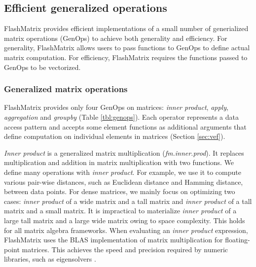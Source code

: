 
\subsection{Efficient generalized operations}
FlashMatrix provides efficient implementations of a small number of
generialized matrix operations (GenOps) to achieve both generality and
efficiency. For generality, FlashMatrix allows users to pass functions to
GenOps to define actual matrix computation. For efficiency, FlashMatrix
requires the functions passed to GenOps to be vectorized.

\subsubsection{Generalized matrix operations} \label{sec:genop}
FlashMatrix provides only four GenOps on matrices: \textit{inner product},
\textit{apply}, \textit{aggregation} and \textit{groupby} (Table
\ref{tbl:genops}). Each operator represents a data access pattern and
accepts some element functions as additional
arguments that define computation on individual elements in matrices (Section
\ref{sec:vef}).

\textit{Inner product} is a generalized matrix multiplication (\textit{fm.inner.prod}).
It replaces multiplication and addition in matrix multiplication with two functions.
We define many operations with \textit{inner product}. For example, we use it
to compute various pair-wise distances, such as Euclidean distance and Hamming
distance, between data points. For dense matrices, we mainly focus on optimizing
two cases: \textit{inner product} of a wide matrix and a tall matrix and
\textit{inner product} of a tall matrix and a small matrix. It is impractical to
materialize \textit{inner product} of a large tall matrix and a large wide matrix
owing to space complexity. This holds for all matrix algebra frameworks.
When evaluating an \textit{inner product} expression, FlashMatrix uses the BLAS
implementation of matrix multiplication for floating-point matrices.
This achieves the speed and precision required by
numeric libraries, such as eigensolvers \cite{anasazi, flasheigen}.

